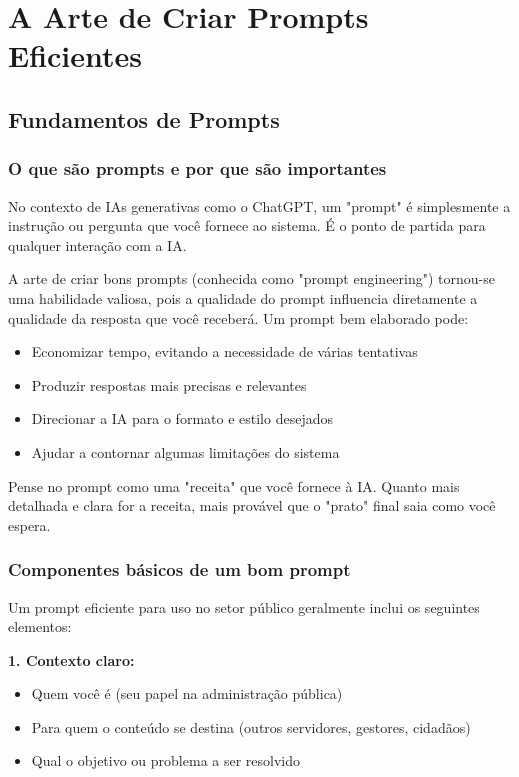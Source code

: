 \documentclass[12pt,a4paper]{book}
\begin{document}
\chapter{A Arte de Criar Prompts Eficientes}

\section{Fundamentos de Prompts}

\subsection{O que são prompts e por que são importantes}

No contexto de IAs generativas como o ChatGPT, um "prompt" é simplesmente a instrução ou pergunta que você fornece ao sistema. É o ponto de partida para qualquer interação com a IA.

A arte de criar bons prompts (conhecida como "prompt engineering") tornou-se uma habilidade valiosa, pois a qualidade do prompt influencia diretamente a qualidade da resposta que você receberá. Um prompt bem elaborado pode:

\begin{itemize}
    \item Economizar tempo, evitando a necessidade de várias tentativas
    \item Produzir respostas mais precisas e relevantes
    \item Direcionar a IA para o formato e estilo desejados
    \item Ajudar a contornar algumas limitações do sistema
\end{itemize}

\begin{tcolorbox}[dica]
Pense no prompt como uma "receita" que você fornece à IA. Quanto mais detalhada e clara for a receita, mais provável que o "prato" final saia como você espera.
\end{tcolorbox}

\subsection{Componentes básicos de um bom prompt}

Um prompt eficiente para uso no setor público geralmente inclui os seguintes elementos:

\textbf{1. Contexto claro:}
\begin{itemize}
    \item Quem você é (seu papel na administração pública)
    \item Para quem o conteúdo se destina (outros servidores, gestores, cidadãos)
    \item Qual o objetivo ou problema a ser resolvido
\end{itemize}
\end{document}
